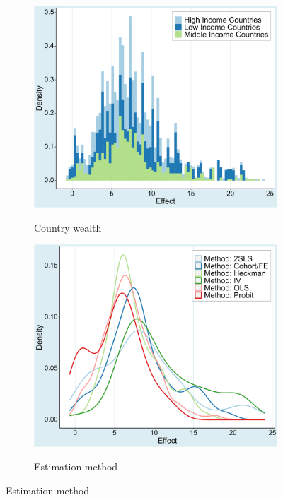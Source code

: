 \begin{figure}[!htbp]
\begin{center}
      \begin{subfigure}[!htbp]{0.38\textwidth}
         \vspace{0.2cm}
         \caption{Country wealth}
         \vspace{-0.1cm}
         \includegraphics[width=0.95\linewidth]{Figures/Prima Facie/prima_facie_income.png}
         \label{fig:prima_facie_income}
      \end{subfigure}
      \begin{subfigure}[!htbp]{0.38\textwidth}
         \vspace{0.2cm}
         \caption{Estimation method}
         \vspace{-0.1cm}
         \includegraphics[width=0.95\linewidth]{Figures/Prima Facie/prima_facie_method.png}
         \label{fig:prima_facie_method}
      \end{subfigure}


\end{center}
\end{figure}
